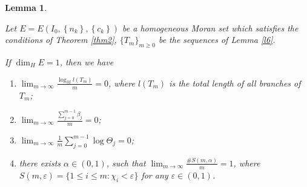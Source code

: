 \documentclass[10pt,a4paper]{amsart}
\newtheorem{lem}{Lemma}
\begin{document}
\begin{lem}\label{l10}

Let $E=E(I_{0},\left\{n_{k}\right\},\left\{c_{k}\right\})$ be a homogeneous Moran set which satisfies the conditions of Theorem {\rm\ref{thm2}}, $\{T_{m}\}_{m\ge 0}$ be the sequences of Lemma {\rm\ref{l6}}.


If $\dim_{H}E=1$, then we have
\begin{enumerate}
\item[\textup{(1)}]$\lim_{m\to \infty}\frac{\log_{M}l(T_{m}) }{m}=0$, where $l(T_{m})$ is the total length of all branches of $T_{m}$;
\item[\textup{(2)}]$\lim_{m\to \infty}\frac{\sum_{j=0}^{m-1}\beta_{j}}{m}=0$;
\item[\textup{(3)}]$\lim_{m \to \infty} \frac{1}{m} \sum_{j=0}^{m-1}\log\Theta_j=0$;
\item[\textup{(4)}]there exists $\alpha\in (0,1)$, such that $\lim_{m\to \infty}  \frac{\# S(m,\alpha )}{m}=1$, where $S(m,\varepsilon)=\{1\le i\le m:\chi_i<\varepsilon\}$ for any $\varepsilon\in (0,1)$.
\end{enumerate}

\end{lem}
\end{document}
